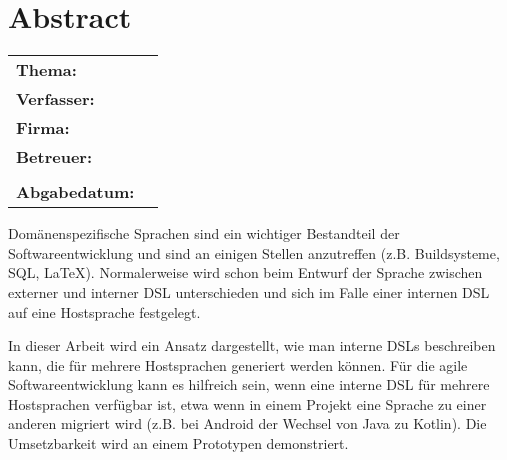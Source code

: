 \documentclass[../InterneDSLs.tex]{subfiles}
\begin{document}
\chapter*{Abstract}

\begin{center}
	\begin{tabular}{ll}
		\textbf{Thema:} 		& \topic\\
		\textbf{Verfasser:} 	& \authorName\\
		\textbf{Firma:} 		& \companyName\\
		\textbf{Betreuer:}		& \proffessor\\
								& \carer\\
		\textbf{Abgabedatum:}	& \closingdate\\
	\end{tabular}
\end{center}

\bigskip
Domänenspezifische Sprachen sind ein wichtiger Bestandteil der Softwareentwicklung und sind an einigen Stellen anzutreffen (z.B. Buildsysteme, SQL, \LaTeX). Normalerweise wird schon beim Entwurf der Sprache zwischen externer und interner DSL unterschieden und sich im Falle einer internen DSL auf eine Hostsprache festgelegt.

In dieser Arbeit wird ein Ansatz dargestellt, wie man interne DSLs beschreiben kann, die für mehrere Hostsprachen generiert werden können. Für die agile Softwareentwicklung kann es hilfreich sein, wenn eine interne DSL für mehrere Hostsprachen verfügbar ist, etwa wenn in einem Projekt eine Sprache zu einer anderen migriert wird (z.B. bei Android der Wechsel von Java zu Kotlin). Die Umsetzbarkeit wird an einem Prototypen demonstriert.
\newpage
\end{document}
